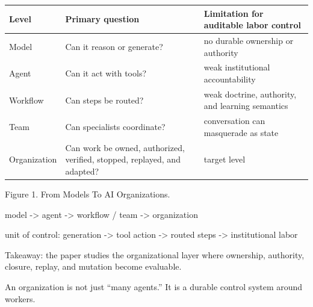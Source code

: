 \documentclass[
]{article}
\newenvironment{Shaded}{}{}
\newcommand{\NormalTok}[1]{#1}
\newcounter{none} %
\begin{document}
{\def\LTcaptype{none} %
\begin{longtable}[]{@{}
  >{\raggedright\arraybackslash}p{}
  >{\raggedright\arraybackslash}p{}
  >{\raggedright\arraybackslash}p{}@{}}
\toprule\noalign{}
\begin{minipage}[b]{\linewidth}\raggedright
Level
\end{minipage} & \begin{minipage}[b]{\linewidth}\raggedright
Primary question
\end{minipage} & \begin{minipage}[b]{\linewidth}\raggedright
Limitation for auditable labor control
\end{minipage} \\
\midrule\noalign{}
\endhead
\bottomrule\noalign{}
\endlastfoot
Model & Can it reason or generate? & no durable ownership or authority \\
Agent & Can it act with tools? & weak institutional accountability \\
Workflow & Can steps be routed? & weak doctrine, authority, and learning semantics \\
Team & Can specialists coordinate? & conversation can masquerade as state \\
Organization & Can work be owned, authorized, verified, stopped, replayed, and adapted? & target level \\
\end{longtable}
}

Figure 1. From Models To AI Organizations.

\begin{Shaded}
\begin{Highlighting}[]
\NormalTok{model}
\NormalTok{  {-}\textgreater{} agent}
\NormalTok{  {-}\textgreater{} workflow / team}
\NormalTok{  {-}\textgreater{} organization}

\NormalTok{unit of control:}
\NormalTok{generation {-}\textgreater{} tool action {-}\textgreater{} routed steps {-}\textgreater{} institutional labor}
\end{Highlighting}
\end{Shaded}

Takeaway: the paper studies the organizational layer where ownership, authority, closure, replay, and mutation become evaluable.

An organization is not just ``many agents.'' It is a durable control system around workers.
\end{document}
